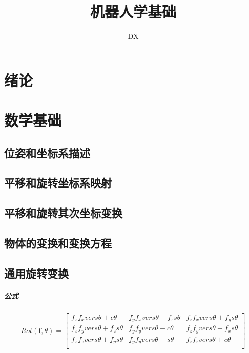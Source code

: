 \documentclass[11pt]{book}
\begin{document}
\begin{titlepage}
	\title{机器人学基础}
	\author{DX}
	\maketitle
\end{titlepage}

\tableofcontents

\chapter{绪论}

\chapter{数学基础}

\section{位姿和坐标系描述}

\section{平移和旋转坐标系映射}

\section{平移和旋转其次坐标变换}

\section{物体的变换和变换方程}

\section{通用旋转变换}

\paragraph{公式}%
\label{par:gong_shi_}

\begin{equation}
	Rot(\boldsymbol{f},\theta) = \left[
		\begin{matrix}
			f_x f_x vers\theta + c\theta & f_y f_x vers\theta - f_z s\theta & f_z f_x vers\theta + f_y s\theta \\
			f_x f_y vers\theta + f_z s\theta & f_y f_y vers\theta - c\theta & f_z f_y vers\theta + f_x s\theta \\
			f_x f_z vers\theta + f_y s\theta & f_y f_y vers\theta - s\theta & f_z f_z vers\theta + c\theta \\
		\end{matrix}
	\right]
\end{equation}
\end{document}

